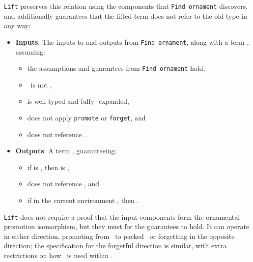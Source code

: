 \lstinline{Lift} preserves this relation using the components that \lstinline{Find ornament} discovers,
and additionally guarantees that the lifted term does not refer to the old type in any way:

\begin{itemize}
\item \textbf{Inputs}: The inputs to and outputs from \lstinline{Find ornament}, along with a term , assuming: %
\begin{itemize}
\item the assumptions and guarantees from \lstinline{Find ornament} hold,
\item \IB\ is not \Aa,
\item {} is well-typed and fully \smallmath{$\eta$}-expanded,
\item {} does not apply \lstinline{promote} or \lstinline{forget}, and
\item {} does not reference \B.
\end{itemize}
\item \textbf{Outputs}: A term , guaranteeing:
\begin{itemize}
\item if  is , then  is ,
\item {} does not reference \Aa, and
\item if in the current environment , then .
\end{itemize}
\end{itemize}

\lstinline{Lift} does not require a proof
that the input components form the ornamental promotion isomorphism, but they must for the guarantees to hold. It can operate in either direction, promoting from \Aa\ to packed \B\ or forgetting in the opposite direction; the specification for the forgetful direction is similar, with extra
restrictions on how \B\ is used within .

